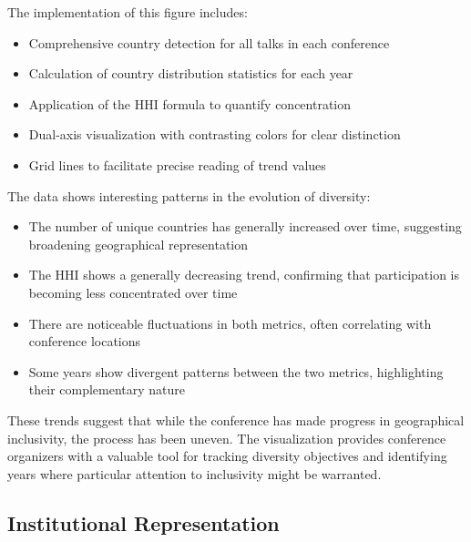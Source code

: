 \documentclass[a4paper,11pt]{article}
\begin{document}
The implementation of this figure includes:

\begin{itemize}
    \item Comprehensive country detection for all talks in each conference
    \item Calculation of country distribution statistics for each year
    \item Application of the HHI formula to quantify concentration
    \item Dual-axis visualization with contrasting colors for clear distinction
    \item Grid lines to facilitate precise reading of trend values
\end{itemize}

The data shows interesting patterns in the evolution of diversity:

\begin{itemize}
    \item The number of unique countries has generally increased over time, suggesting broadening geographical representation
    \item The HHI shows a generally decreasing trend, confirming that participation is becoming less concentrated over time
    \item There are noticeable fluctuations in both metrics, often correlating with conference locations
    \item Some years show divergent patterns between the two metrics, highlighting their complementary nature
\end{itemize}

These trends suggest that while the conference has made progress in geographical inclusivity, the process has been uneven. The visualization provides conference organizers with a valuable tool for tracking diversity objectives and identifying years where particular attention to inclusivity might be warranted.

\subsection{Institutional Representation}
\end{document}
